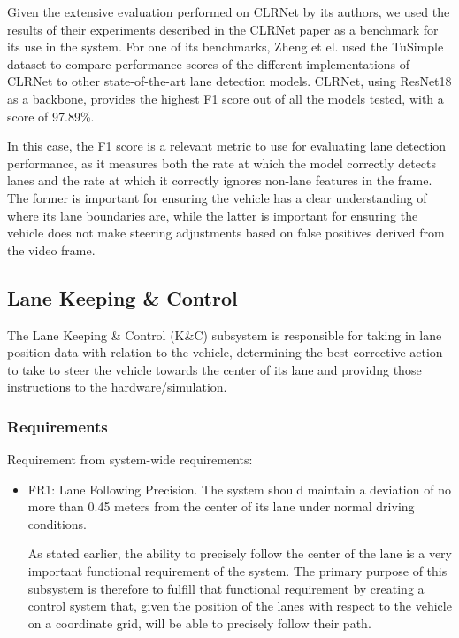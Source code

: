 \documentclass[titlepage, draft]{article}
\begin{document}
{

Given the extensive evaluation performed on CLRNet by its authors, we used the results of their experiments described in
the CLRNet paper \cite{zheng2022clrnet} as a benchmark for its use in the system.
For one of its benchmarks, Zheng et el. used the TuSimple dataset to compare performance scores of the different implementations
of CLRNet to other state-of-the-art lane detection models.
CLRNet, using ResNet18 as a backbone, provides the highest F1 score out of all the models tested, with a score of 97.89\%.

In this case, the F1 score is a relevant metric to use for evaluating lane detection performance, as it measures both
the rate at which the model correctly detects lanes and the rate at which it correctly ignores non-lane features in the frame.
The former is important for ensuring the vehicle has a clear understanding of where its lane boundaries are, while the latter
is important for ensuring the vehicle does not make steering adjustments based on false positives derived from the video frame.

\subsection{Lane Keeping \& Control}
The Lane Keeping \& Control (K\&C) subsystem is responsible for taking in lane position data with relation to the vehicle, determining the best corrective action to take to steer the vehicle towards the center of its lane and providng those instructions to the hardware/simulation.

\subsubsection{Requirements}
Requirement from system-wide requirements:

\begin{itemize}
	\item FR1: Lane Following Precision. The system should maintain a deviation of no more than 0.45 meters from the center of its lane under normal driving conditions.

	      As stated earlier, the ability to precisely follow the center of the lane is a very important functional requirement of the system. The primary purpose of this subsystem is therefore to fulfill that functional requirement by creating a control system that, given the position of the lanes with respect to the vehicle on a coordinate grid, will be able to precisely follow their path.


\end{itemize}}
\end{document}
